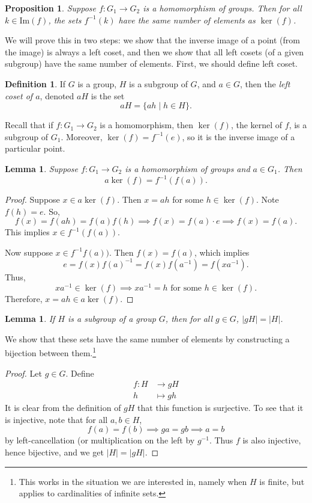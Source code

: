 \documentclass[12pt]{amsart}
\renewcommand{\Im}{\textrm{Im}} %
\theoremstyle{plain}
\newtheorem{prop}[thm]{Proposition}
\newtheorem{lemma}[thm]{Lemma}
\theoremstyle{definition}
\newtheorem{defn}[thm]{Definition}
\theoremstyle{remark}
\begin{document}
\begin{prop}
  Suppose $f:G_1\to G_2$ is a homomorphism of groups.  Then for all $k\in
  \Im(f)$, the sets $f^{-1}(k)$ have the same number of elements as
  $\ker(f)$.
\end{prop}
We will prove this in two steps: we show that the inverse image of a
point (from the image) is always a left coset, and then we show that
all left cosets (of a given subgroup) have the same number of
elements.  First, we should define left coset.
\begin{defn}
  If $G$ is a group, $H$ is a subgroup of $G$, and $a\in G$, then the
  \emph{left coset of $a$}, denoted $aH$ is the set
  \[ aH=\{ah\mid h\in H\}.\]
\end{defn}
Recall that if $f:G_1\to G_2$ is a homomorphism, then $\ker(f)$, the
kernel of $f$, is a subgroup of $G_1$.  Moreover, $\ker(f) = f^{-1}(e)$,
so it is the inverse image of a particular point.
\begin{lemma}
  Suppose $f:G_1\to G_2$ is a homomorphism of groups and $a\in G_1$.  Then
  \[ a\ker(f) = f^{-1}(f(a)).\]
\end{lemma}
\begin{proof}
  Suppose $x\in a\ker(f)$.  Then $x=ah$ for some $h\in\ker(f)$.  Note
  $f(h) =e$.  So, 
\[ f(x) = f(ah) = f(a)f(h) 
     \implies f(x) = f(a)\cdot e 
     \implies f(x)= f(a). \]
This implies $x\in f^{-1}(f(a))$.  

Now suppose $x\in f^{-1}f(a))$.  Then $f(x)=f(a)$, which implies
\[ e=f(x)f(a)^{-1} = f(x) f(a^{-1}) = f(xa^{-1}).\]
Thus, 
$$xa^{-1}\in \ker(f) \implies xa^{-1} = h \text{ for some $h\in\ker(f)$}.$$
Therefore, $x=ah\in a\ker(f)$.
\end{proof}
\begin{lemma}
  If $H$ is a subgroup of a group $G$, then for all $g\in G$, $|gH| =
  |H|$.
\end{lemma}
  We show that these sets have the same number of elements by 
  constructing a bijection between them.\footnote{This works in the situation
  we are interested in, namely when $H$ is finite, but applies to
  cardinalities of infinite sets.}
\begin{proof}
  Let $g\in G$.  Define
\begin{align*}
  f:H&\to gH \\
  h&\mapsto gh
\end{align*}
It is clear from the definition of $gH$ that this function is surjective.
To see that it is injective, note that for all $a,b\in H$,
\[  f(a) = f(b) \implies ga = gb \implies a=b\]
by left-cancellation (or multiplication on the left by $g^{-1}$.  Thus
$f$ is also injective, hence bijective, and we get $|H|=|gH|$.
\end{proof}
\end{document}
